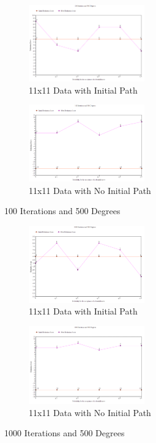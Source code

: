 \documentclass[11pt, oneside]{article}   	%
\begin{document}
\begin{figure}[H]
\centering
\begin{subfigure}{.5\textwidth}
	\centering
	\includegraphics[width=50mm]{11x11lowIhighT.png}
	\caption{11x11 Data with Initial Path}
	\label{fig:method}
\end{subfigure}%
\begin{subfigure}{.5\textwidth}
	\centering
	\includegraphics[width=50mm]{11x11lowIhighTPath.png}
	\caption{11x11 Data with No Initial Path}
	\label{fig:method}
\end{subfigure}
\caption{100 Iterations and 500 Degrees}
\end{figure}

\begin{figure}[H]
\centering
\begin{subfigure}{.5\textwidth}
	\centering
	\includegraphics[width=50mm]{11x11highIhighT.png}
	\caption{11x11 Data with Initial Path}
	\label{fig:method}
\end{subfigure}%
\begin{subfigure}{.5\textwidth}
	\centering
	\includegraphics[width=50mm]{11x11highIhighTPath.png}
	\caption{11x11 Data with No Initial Path}
	\label{fig:method}
\end{subfigure}
\caption{1000 Iterations and 500 Degrees}
\end{figure}
\end{document}
